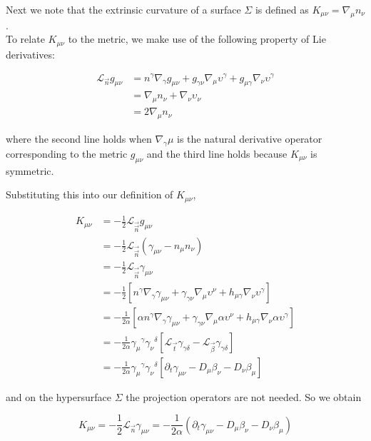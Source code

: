 \documentclass[11pt,a4paper,headinclude=true,DIV=14,BCOR=8mm,chapterprefix,listof=totoc,twoside,openright,abstracton]{scrbook}
\begin{document}
Next we note that the extrinsic curvature of a
surface $\Sigma$ is defined as $K_{\mu\nu} = \nabla_{\mu}n_{\nu}$. \\
To relate $K_{\mu\nu}$ to the metric, we make use of the following property of Lie derivatives:

\begin{align}
    \mathcal{L}_{\vec{n}}g_{\mu\nu} &= n^{\gamma}\nabla_{\gamma}g_{\mu\nu} + g_{\gamma\nu}\nabla_{\mu}\upsilon^{\gamma} + g_{\mu\gamma}\nabla_{\nu}\upsilon^{\gamma} \\
    &= \nabla_{\mu}n_{\nu}+\nabla_{\nu}\upsilon_{\nu} \\
    &=2\nabla_{\mu}n_{\nu}
\end{align}

where the second line holds when $\nabla_{\gamma}\mu$ is the natural derivative operator corresponding to the metric $g_{\mu\nu}$ and the third line holds because $K_{\mu\nu}$ is symmetric.

Substituting this into our definition of $K_{\mu\nu}$,

\begin{align}
    K_{\mu\nu} &= -\frac{1}{2}\mathcal{L}_{\vec{\vec{n}}}g_{\mu\nu} \\
    &= -\frac{1}{2}\mathcal{L}_{\vec{\vec{n}}}(\gamma_{\mu\nu}-n_{\mu}n_{\nu}) \\
    &= -\frac{1}{2}\mathcal{L}_{\vec{\vec{n}}}\gamma_{\mu\nu} \\
    &= -\frac{1}{2}[n^{\gamma}\nabla_{\gamma}\gamma_{\mu\nu} + \gamma_{\gamma\nu}\nabla_{\mu}\upsilon^{\nu} + h_{\mu\gamma}\nabla_{\nu}\upsilon^{\gamma}] \\
    &= -\frac{1}{2\alpha}[\alpha n^{\gamma}\nabla_{\gamma}\gamma_{\mu\nu} + \gamma_{\gamma\nu}\nabla_{\mu}\alpha\upsilon^{\nu} + h_{\mu\gamma}\nabla_{\nu}\alpha\upsilon^{\gamma}] \\
    &= -\frac{1}{2\alpha}{\gamma_{\mu}}^{\gamma}{\gamma_{\nu}}^{\delta}[\mathcal{L}_{\vec{t}}\gamma_{\gamma\delta}-\mathcal{L}_{\vec{\beta}}\gamma_{\gamma\delta}] \\
    &= -\frac{1}{2\alpha}{\gamma_{\mu}}^{\gamma}{\gamma_{\nu}}^{\delta}[\partial_t\gamma_{\mu\nu}-D_{\mu}\beta_{\nu}-D_{\nu}\beta_{\mu}]
\end{align}

and on the hypersurface $\Sigma$ the projection operators are not needed. So we obtain

\begin{equation}
    K_{\mu\nu} = -\frac{1}{2}\mathcal{L}_{\vec{n}}\gamma_{\mu\nu}=-\frac{1}{2\alpha}(\partial_t\gamma_{\mu\nu}-D_{\mu}\beta_{\nu}-D_{\nu}\beta_{\mu})
\end{equation}
\end{document}
